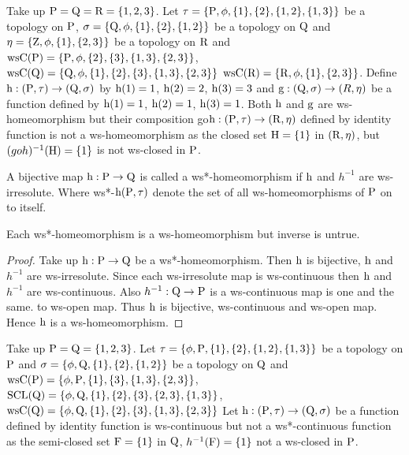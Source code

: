 \begin{exm}\label{exam5.2.8}
Take up $\mathrm{P}=\mathrm{Q}=\mathrm{R}= \{1, 2, 3\}$. Let $\tau= \{\TSP, \phi, \{1\}, \{2\}, \{1,2\},\break \{1,3\}\}$ be a topology on $\mathrm{P}$, $\sigma= \{\mathrm{Q}, \phi, \{1\}, \{2\}, \{1,2\}\}$ be a topology on $\mathrm{Q}$ and $\eta= \{\mathrm{Z}, \phi, \{1\}, \{2,3\}\}$ be a topology on $\mathrm{R}$ and $\mathrm{ws}\mathrm{C}(\mathrm{P})= \{\mathrm{P}, \phi, \{2\}, \{3\}, \{1, 3\}, \{2, 3\}\}$, $\mathrm{ws}\mathrm{C}(\mathrm{Q})= \{\mathrm{Q}, \phi, \{1\},\{2\}, \{3\}, \{1,3\}, \{2, 3\}\}$ $\mathrm{ws}\mathrm{C}(\mathrm{R})= \{\mathrm{R}, \phi, \{1\}, \{2, 3\}\}$. Define $\mathrm{h}: (\mathrm{P}, \tau) \to (\mathrm{Q},\sigma)$ by $\mathrm{h}(1)=1$, $\mathrm{h}(2) =2$, $\mathrm{h}(3)=3$ and $\mathrm{g}: (\mathrm{Q},\sigma)\to (R, \eta)$ be a function defined by $\mathrm{h}(1)=1$, $\mathrm{h}(2)= 1$, $\mathrm{h}(3)=1$. Both $\mathrm{h}$ and $\mathrm{g}$ are ws-homeomorphism but their composition go$\mathrm{h}: (\mathrm{P}, \tau)\to (\mathrm{R}, \eta)$ defined by identity function is not a ws-homeomorphism as the closed set $\mathrm{H}=\{1\}$ in $(\mathrm{R}, \eta)$, but $(goh)^{-1} (\mathrm{H})=\{1\}$ is not ws-closed in $\mathrm{P}$.
\end{exm}

\begin{dfn}\label{defi5.2.2}
A bijective map $\mathrm{h}: \mathrm{P}\to \mathrm{Q}$ is called a ws*-homeomorphism if $\mathrm{h}$ and $h^{-1}$ are ws-irresolute. Where ws*-$\mathrm{h}(\mathrm{P}, \tau)$ denote the set of all ws-homeomorphisms of $\mathrm{P}$ on to itself.
\end{dfn}

\begin{thm}\label{thm5.2.6}
Each ws*-homeomorphism is a ws-homeomorphism but inverse is untrue.
\end{thm}

\begin{proof}
Take up $\mathrm{h}: \mathrm{P}\to \mathrm{Q}$ be a ws*-homeomorphism. Then $\mathrm{h}$ is bijective, $\mathrm{h}$ and $h^{-1}$ are ws-irresolute. Since each ws-irresolute map is ws-continuous then $\mathrm{h}$ and $h^{-1}$ are ws-continuous. Also $h^{-1} : \mathrm{Q} \to \mathrm{P}$ is a ws-continuous map is one and the same. to ws-open map. Thus $\mathrm{h}$ is bijective, ws-continuous and ws-open map. Hence $\mathrm{h}$ is a ws-homeomorphism.
\end{proof}

\begin{exm}\label{exam5.2.9}
Take up $\mathrm{P}=\mathrm{Q}= \{1, 2, 3\}$. Let $\tau= \{\phi, \mathrm{P}, \{1\}, \{2\}, \{1,2\},\{1,3\}\}$ be a topology on $\mathrm{P}$ and $\sigma=\{\phi, \mathrm{Q}, \{1\}, \{2\},\{1,2\}\}$ be a topology on $\mathrm{Q}$ and $\ws\TSC(\TSP)\break = \{\phi, \TSP, \{1\},\{3\}, \{1,3\},\{2,3\}\}$, $\mathrm{SCL}(\mathrm{Q}) =\{\phi, \mathrm{Q}, \{1\},\{2\},\{3\},\{2, 3\},\{1,3\}\}$,\break $\mathrm{ws}\mathrm{C}(\mathrm{Q})= \{\phi, \mathrm{Q}, \{1\},\{2\},\{3\}, \{1,3\},\{2,3\}\}$ Let $\mathrm{h}: (\mathrm{P}, \tau )\to (\mathrm{Q}, \sigma)$ be a function defined by identity function is ws-continuous but not a ws*-continuous function as the semi-closed set $\mathrm{F}=\{1\}$ in $\mathrm{Q}$, $h^{-1}(\mathrm{F})=\{1\}$ not a ws-closed in $\mathrm{P}$.
\end{exm}

